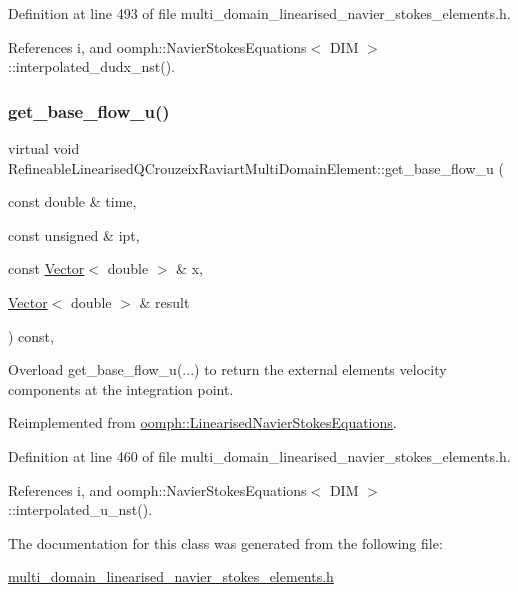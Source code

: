 Definition at line 493 of file multi\+\_\+domain\+\_\+linearised\+\_\+navier\+\_\+stokes\+\_\+elements.\+h.



References i, and oomph\+::\+Navier\+Stokes\+Equations$<$ D\+I\+M $>$\+::interpolated\+\_\+dudx\+\_\+nst().

\mbox{\label{classRefineableLinearisedQCrouzeixRaviartMultiDomainElement_a029e6ec7bfe31971e78cf0208bf8c3e9}} 
\subsubsection{\texorpdfstring{get\+\_\+base\+\_\+flow\+\_\+u()}{get\_base\_flow\_u()}}
{\footnotesize\ttfamily virtual void Refineable\+Linearised\+Q\+Crouzeix\+Raviart\+Multi\+Domain\+Element\+::get\+\_\+base\+\_\+flow\+\_\+u (\begin{DoxyParamCaption}\item[{const double \&}]{time,  }\item[{const unsigned \&}]{ipt,  }\item[{const \hyperlink{classoomph_1_1Vector}{Vector}$<$ double $>$ \&}]{x,  }\item[{\hyperlink{classoomph_1_1Vector}{Vector}$<$ double $>$ \&}]{result }\end{DoxyParamCaption}) const\hspace{0.3cm}{\ttfamily [inline]}, {\ttfamily [virtual]}}



Overload get\+\_\+base\+\_\+flow\+\_\+u(...) to return the external element\textquotesingle{}s velocity components at the integration point. 



Reimplemented from \hyperlink{classoomph_1_1LinearisedNavierStokesEquations_a7c219a316dbe67ef01f8c5b666e0c9ae}{oomph\+::\+Linearised\+Navier\+Stokes\+Equations}.



Definition at line 460 of file multi\+\_\+domain\+\_\+linearised\+\_\+navier\+\_\+stokes\+\_\+elements.\+h.



References i, and oomph\+::\+Navier\+Stokes\+Equations$<$ D\+I\+M $>$\+::interpolated\+\_\+u\+\_\+nst().



The documentation for this class was generated from the following file\+:\begin{DoxyCompactItemize}
\item 
\hyperlink{multi__domain__linearised__navier__stokes__elements_8h}{multi\+\_\+domain\+\_\+linearised\+\_\+navier\+\_\+stokes\+\_\+elements.\+h}\end{DoxyCompactItemize}
